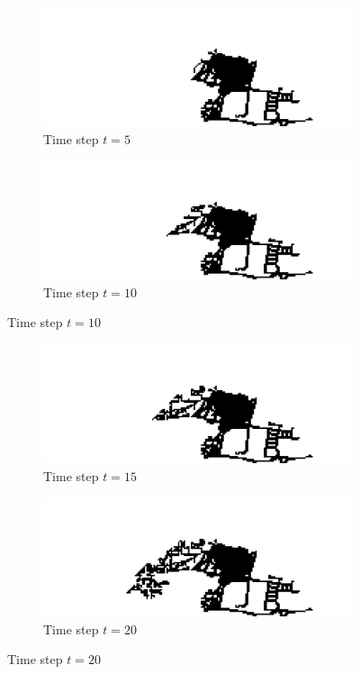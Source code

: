 \begin{figure}[H]
\begin{subfigure}{.5\textwidth}
  \centering
  \includegraphics[width=1\linewidth]{Figures/Chapter4/generation-5-melusi}
  \caption*{Time step $t = 5$}
\end{subfigure}
\begin{subfigure}{.5\textwidth}
  \centering
  \includegraphics[width=1\linewidth]{Figures/Chapter4/generation-10-melusi}
  \caption*{Time step $t = 10$}
\end{subfigure}
\end{figure}

\begin{figure}[H]
\begin{subfigure}{.5\textwidth}
  \centering
  \includegraphics[width=1\linewidth]{Figures/Chapter4/generation-15-melusi}
  \caption*{Time step $t = 15$}
\end{subfigure}
\begin{subfigure}{.5\textwidth}
  \centering
  \includegraphics[width=1\linewidth]{Figures/Chapter4/generation-20-melusi}
  \caption*{Time step $t = 20$}
\end{subfigure}
\end{figure}

